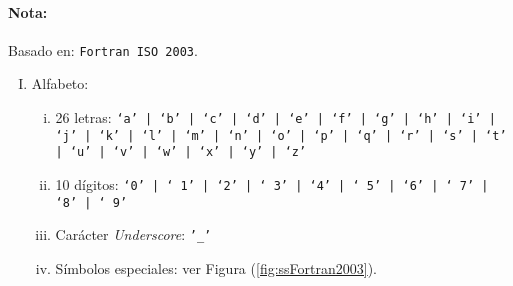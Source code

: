 \paragraph*{Nota:} Basado en: \texttt{Fortran ISO 2003}.

\begin{enumerate}[I.]

\item Alfabeto:

\begin{enumerate}[i.]

\item 26 letras:
\texttt{\textquoteleft a\textquoteright\ | \textquoteleft b\textquoteright\  |
\textquoteleft c\textquoteright\  | \textquoteleft d\textquoteright\  |
\textquoteleft e\textquoteright\  | \textquoteleft f\textquoteright\  |
\textquoteleft g\textquoteright\  | \textquoteleft h\textquoteright\  |
\textquoteleft i\textquoteright\ | \textquoteleft j\textquoteright\ 
          | \textquoteleft k\textquoteright\ | \textquoteleft l\textquoteright\
| \textquoteleft m\textquoteright\ | \textquoteleft n\textquoteright\ |
\textquoteleft o' | \textquoteleft p' | \textquoteleft q\textquoteright\ |
\textquoteleft r\textquoteright\ | \textquoteleft s\textquoteright\ |
\textquoteleft t\textquoteright
          | \textquoteleft u\textquoteright\ | \textquoteleft v\textquoteright\
| \textquoteleft w\textquoteright\ | \textquoteleft x\textquoteright\ |
\textquoteleft y\textquoteright\ | \textquoteleft z\textquoteright\ }

\item 10 dígitos: \texttt{\textquoteleft 0\textquoteright\ | \textquoteleft
1\textquoteright\ | \textquoteleft 2\textquoteright\ | \textquoteleft
3\textquoteright\ | \textquoteleft 4\textquoteright\ | \textquoteleft
5\textquoteright\ | \textquoteleft 6\textquoteright\ | \textquoteleft
7\textquoteright\ | \textquoteleft 8\textquoteright\ | \textquoteleft
9\textquoteright\ }

\item Carácter \textit{Underscore}: \texttt{'\_'}

\item Símbolos especiales: ver Figura (\ref{fig:ssFortran2003}).


\begin{figure}


\end{figure}
\end{enumerate}
\end{enumerate}

